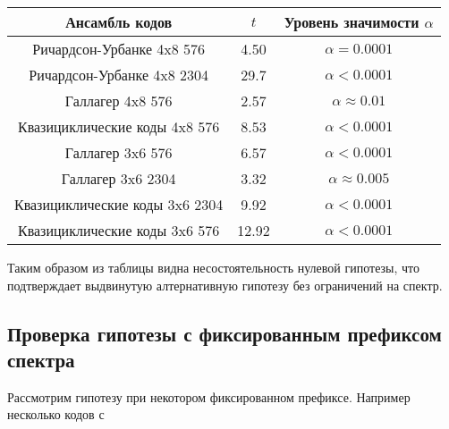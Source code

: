 \begin{tabular}{|c|c|c|}
	\hline
	Ансамбль кодов & $t$ & Уровень значимости $\alpha$\\
	\hline
	Ричардсон-Урбанке 4x8 576 & 4.50 &  $\alpha = 0.0001$\\
	\hline
	Ричардсон-Урбанке 4x8 2304 & 29.7 & $\alpha < 0.0001$ \\
	\hline
	Галлагер 4x8 576 & 2.57 & $\alpha \approx 0.01$ \\
	\hline
	Квазициклические коды 4x8 576 & 8.53 & $\alpha < 0.0001$ \\
	\hline
	Галлагер 3x6 576 & 6.57 & $\alpha < 0.0001$ \\
	\hline
	Галлагер 3x6 2304 & 3.32 & $\alpha \approx 0.005$ \\
	\hline
	Квазициклические коды 3x6 2304 & 9.92 & $\alpha < 0.0001$ \\
	\hline
	Квазициклические коды 3x6 576 & 12.92 & $\alpha < 0.0001$ \\
	\hline
\end{tabular}

Таким образом из таблицы видна несостоятельность нулевой гипотезы, что подтверждает выдвинутую алтернативную
гипотезу без ограничений на спектр.

\subsection{Проверка гипотезы с фиксированным префиксом спектра}

Рассмотрим гипотезу при некотором фиксированном префиксе. Например несколько кодов с 





























